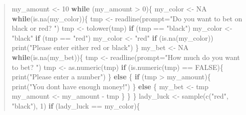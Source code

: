 \documentclass[
  letterpaper,
  DIV=11,
  numbers=noendperiod]{scrreprt}
\newenvironment{Shaded}{\begin{snugshade}}{\end{snugshade}}
\newcommand{\AttributeTok}[1]{\textcolor[rgb]{0.40,0.45,0.13}{#1}}
\newcommand{\ConstantTok}[1]{\textcolor[rgb]{0.56,0.35,0.01}{#1}}
\newcommand{\ControlFlowTok}[1]{\textcolor[rgb]{0.00,0.23,0.31}{\textbf{#1}}}
\newcommand{\DecValTok}[1]{\textcolor[rgb]{0.68,0.00,0.00}{#1}}
\newcommand{\FunctionTok}[1]{\textcolor[rgb]{0.28,0.35,0.67}{#1}}
\newcommand{\NormalTok}[1]{\textcolor[rgb]{0.00,0.23,0.31}{#1}}
\newcommand{\OtherTok}[1]{\textcolor[rgb]{0.00,0.23,0.31}{#1}}
\newcommand{\SpecialCharTok}[1]{\textcolor[rgb]{0.37,0.37,0.37}{#1}}
\newcommand{\StringTok}[1]{\textcolor[rgb]{0.13,0.47,0.30}{#1}}
\begin{document}
\begin{quote}
\begin{Shaded}
\begin{Highlighting}[]
\NormalTok{my\_amount }\OtherTok{\textless{}{-}} \DecValTok{10}
\ControlFlowTok{while}\NormalTok{ (my\_amount }\SpecialCharTok{\textgreater{}} \DecValTok{0}\NormalTok{)\{}
\NormalTok{  my\_color }\OtherTok{\textless{}{-}} \ConstantTok{NA}
  \ControlFlowTok{while}\NormalTok{(}\FunctionTok{is.na}\NormalTok{(my\_color))\{}
\NormalTok{    tmp }\OtherTok{\textless{}{-}} \FunctionTok{readline}\NormalTok{(}\AttributeTok{prompt=}\StringTok{"Do you want to bet on black or red? "}\NormalTok{)}
\NormalTok{    tmp }\OtherTok{\textless{}{-}} \FunctionTok{tolower}\NormalTok{(tmp)}
    \ControlFlowTok{if}\NormalTok{ (tmp }\SpecialCharTok{==} \StringTok{"black"}\NormalTok{) my\_color }\OtherTok{\textless{}{-}} \StringTok{"black"}
    \ControlFlowTok{if}\NormalTok{ (tmp }\SpecialCharTok{==} \StringTok{"red"}\NormalTok{) my\_color }\OtherTok{\textless{}{-}} \StringTok{"red"}
    \ControlFlowTok{if}\NormalTok{ (}\FunctionTok{is.na}\NormalTok{(my\_color)) }\FunctionTok{print}\NormalTok{(}\StringTok{"Please enter either red or black"}\NormalTok{)}
\NormalTok{  \}}
\NormalTok{  my\_bet }\OtherTok{\textless{}{-}} \ConstantTok{NA}
  \ControlFlowTok{while}\NormalTok{(}\FunctionTok{is.na}\NormalTok{(my\_bet))\{}
\NormalTok{    tmp }\OtherTok{\textless{}{-}} \FunctionTok{readline}\NormalTok{(}\AttributeTok{prompt=}\StringTok{"How much do you want to bet? "}\NormalTok{)}
\NormalTok{    tmp }\OtherTok{\textless{}{-}} \FunctionTok{as.numeric}\NormalTok{(tmp)}
    \ControlFlowTok{if}\NormalTok{ (}\FunctionTok{is.numeric}\NormalTok{(tmp) }\SpecialCharTok{==} \ConstantTok{FALSE}\NormalTok{)\{}
      \FunctionTok{print}\NormalTok{(}\StringTok{"Please enter a number"}\NormalTok{)}
\NormalTok{    \} }\ControlFlowTok{else}\NormalTok{ \{}
      \ControlFlowTok{if}\NormalTok{ (tmp }\SpecialCharTok{\textgreater{}}\NormalTok{ my\_amount)\{}
        \FunctionTok{print}\NormalTok{(}\StringTok{"You don\textquotesingle{}t have enough money!"}\NormalTok{)}
\NormalTok{      \} }\ControlFlowTok{else}\NormalTok{ \{}
\NormalTok{        my\_bet }\OtherTok{\textless{}{-}}\NormalTok{ tmp}
\NormalTok{        my\_amount }\OtherTok{\textless{}{-}}\NormalTok{ my\_amount }\SpecialCharTok{{-}}\NormalTok{ tmp}
\NormalTok{      \}}
\NormalTok{    \}}
\NormalTok{  \}}
\NormalTok{  lady\_luck }\OtherTok{\textless{}{-}} \FunctionTok{sample}\NormalTok{(}\FunctionTok{c}\NormalTok{(}\StringTok{"red"}\NormalTok{, }\StringTok{"black"}\NormalTok{), }\DecValTok{1}\NormalTok{)}
  \ControlFlowTok{if}\NormalTok{ (lady\_luck }\SpecialCharTok{==}\NormalTok{ my\_color)\{}

\end{Highlighting}
\end{Shaded}
\end{quote}
\end{document}
